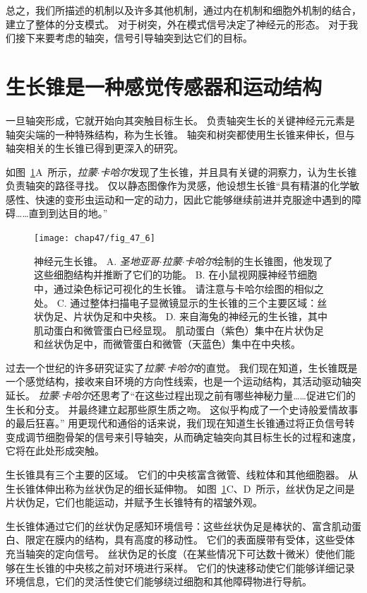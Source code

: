 总之，我们所描述的机制以及许多其他机制，通过内在机制和细胞外机制的结合，建立了整体的分支模式。
对于树突，外在模式信号决定了神经元的形态。
对于我们接下来要考虑的轴突，信号引导轴突到达它们的目标。



\section{生长锥是一种感觉传感器和运动结构}

一旦轴突形成，它就开始向其突触目标生长。
负责轴突生长的关键神经元元素是轴突尖端的一种特殊结构，称为生长锥。
轴突和树突都使用生长锥来伸长，但与轴突相关的生长锥已得到更深入的研究。


如图~\ref{fig:47_6}A~所示，\textit{拉蒙$\cdot$卡哈尔}发现了生长锥，并且具有关键的洞察力，认为生长锥负责轴突的路径寻找。
仅以静态图像作为灵感，他设想生长锥“具有精湛的化学敏感性、快速的变形虫运动和一定的动力，因此它能够继续前进并克服途中遇到的障碍……直到到达目的地。”


\begin{figure}[htbp]
	\centering
	\texttt{[image: chap47/fig\_47\_6]}
	\caption{神经元生长锥。
		A. \textit{圣地亚哥$\cdot$拉蒙$\cdot$卡哈尔}绘制的生长锥图，他发现了这些细胞结构并推断了它们的功能。
		B. 在小鼠视网膜神经节细胞中，通过染色标记可视化的生长锥。
		请注意与卡哈尔绘图的相似之处。
		C. 通过整体扫描电子显微镜显示的生长锥的三个主要区域：丝状伪足、片状伪足和中央核。
		D. 来自海兔的神经元的生长锥，其中肌动蛋白和微管蛋白已经显现。
		肌动蛋白（紫色）集中在片状伪足和丝状伪足中，而微管蛋白和微管（天蓝色）集中在中央核。}
	\label{fig:47_6}
\end{figure}


过去一个世纪的许多研究证实了\textit{拉蒙$\cdot$卡哈尔}的直觉。
我们现在知道，生长锥既是一个感觉结构，接收来自环境的方向性线索，也是一个运动结构，其活动驱动轴突延长。
\textit{拉蒙$\cdot$卡哈尔}还思考了“在这些过程出现之前有哪些神秘力量……促进它们的生长和分支。
并最终建立起那些原生质之吻。
这似乎构成了一个史诗般爱情故事的最后狂喜。” 
用更现代和通俗的话来说，我们现在知道生长锥通过将正负信号转变成调节细胞骨架的信号来引导轴突，从而确定轴突向其目标生长的过程和速度，它将在此处形成突触。


生长锥具有三个主要的区域。
它们的中央核富含微管、线粒体和其他细胞器。
从生长锥体伸出称为丝状伪足的细长延伸物。
如图~\ref{fig:47_6}C、D~所示，丝状伪足之间是片状伪足，它们也能运动，并赋予生长锥特有的褶皱外观。


生长锥体通过它们的丝状伪足感知环境信号：这些丝状伪足是棒状的、富含肌动蛋白、限定在膜内的结构，具有高度的移动性。
它们的表面膜带有受体，这些受体充当轴突的定向信号。
丝状伪足的长度（在某些情况下可达数十微米）使他们能够在生长锥的中央核之前对环境进行采样。
它们的快速移动使它们能够详细记录环境信息，它们的灵活性使它们能够绕过细胞和其他障碍物进行导航。


